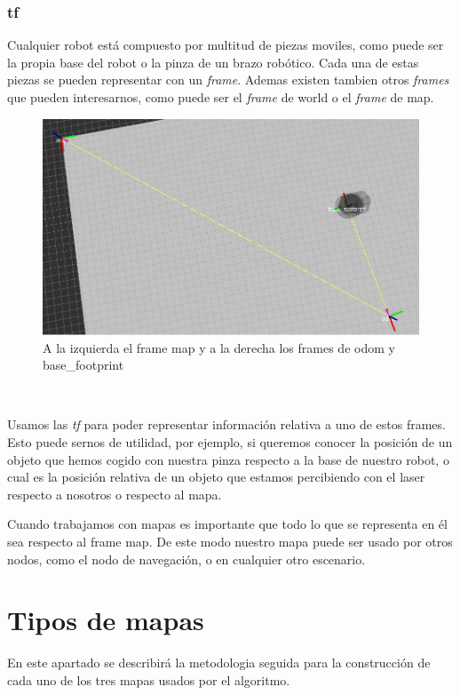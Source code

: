 \subsubsection{tf}
\label{subsubsec:tf}
Cualquier robot está compuesto por multitud de piezas moviles, como puede ser la propia base del robot o la pinza de un brazo robótico. Cada una de estas piezas se pueden representar con un \textit{frame}. Ademas existen tambien otros \textit{frames} que pueden interesarnos, como puede ser el \textit{frame} de world o el \textit{frame} de map.\\
\begin{figure} [hbtp]
  \begin{center}
    \includegraphics[width=12cm]{img/cap4/frames}
  \end{center}
  \caption{A la izquierda el frame map y a la derecha los frames de odom y base\_footprint}
  \label{fig:frames}
\end{figure}\

Usamos las \textit{tf} para poder representar información relativa a uno de estos frames. Esto puede sernos de utilidad, por ejemplo, si queremos conocer la posición de un objeto que hemos cogido con nuestra pinza respecto a la base de nuestro robot, o cual es la posición relativa de un objeto que estamos percibiendo con el laser respecto a nosotros o respecto al mapa.

Cuando trabajamos con mapas es importante que todo lo que se representa en él sea respecto al frame map. De este modo nuestro mapa puede ser usado por otros nodos, como el nodo de navegación, o en cualquier otro escenario.

\section{Tipos de mapas}

En este apartado se describirá la metodologia seguida para la construcción de cada uno de los tres mapas usados por el algoritmo.

